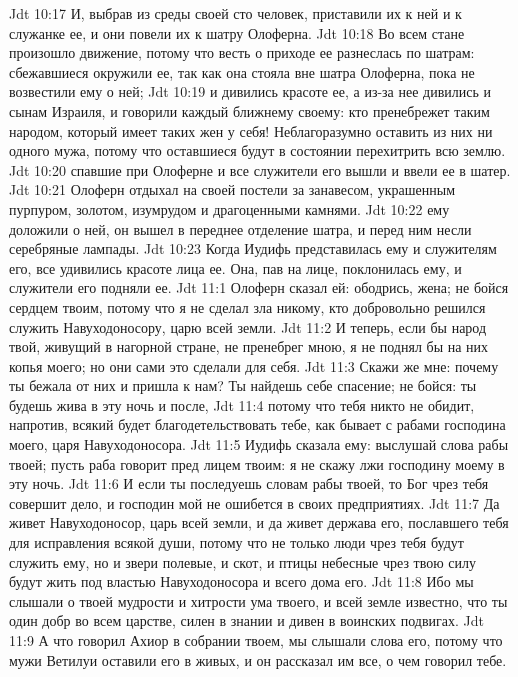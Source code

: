 \vs Jdt 10:17 И, выбрав из среды своей сто человек, приставили их к ней и к служанке ее, и они повели их к шатру Олоферна.
\vs Jdt 10:18 Во всем стане произошло движение, потому что весть о приходе ее разнеслась по шатрам: сбежавшиеся окружили ее, так как она стояла вне шатра Олоферна, пока не возвестили ему о ней;
\vs Jdt 10:19 и дивились красоте ее, а из-за нее дивились и сынам Израиля, и говорили каждый ближнему своему: кто пренебрежет таким народом, который имеет таких жен у себя! Неблагоразумно оставить из них ни одного мужа, потому что оставшиеся будут в состоянии перехитрить всю землю.
\vs Jdt 10:20  спавшие при Олоферне и все служители его вышли и ввели ее в шатер.
\vs Jdt 10:21 Олоферн отдыхал на своей постели за занавесом, украшенным пурпуром, золотом, изумрудом и драгоценными камнями.
\vs Jdt 10:22  ему доложили о ней, он вышел в переднее отделение шатра, и перед ним несли серебряные лампады.
\vs Jdt 10:23 Когда Иудифь представилась ему и служителям его, все удивились красоте лица ее. Она, пав на лице, поклонилась ему, и служители его подняли ее.
\vs Jdt 11:1 Олоферн сказал ей: ободрись, жена; не бойся сердцем твоим, потому что я не сделал зла никому, кто добровольно решился служить Навуходоносору, царю всей земли.
\vs Jdt 11:2 И теперь, если бы народ твой, живущий в нагорной стране, не пренебрег мною, я не поднял бы на них копья моего; но они сами это сделали для себя.
\vs Jdt 11:3 Скажи же мне: почему ты бежала от них и пришла к нам? Ты найдешь себе  спасение; не бойся: ты будешь жива в эту ночь и после,
\vs Jdt 11:4 потому что тебя никто не обидит, напротив, всякий будет благодетельствовать тебе, как бывает с рабами господина моего, царя Навуходоносора.
\vs Jdt 11:5 Иудифь сказала ему: выслушай слова рабы твоей; пусть раба говорит пред лицем твоим: я не скажу лжи господину моему в эту ночь.
\vs Jdt 11:6 И если ты последуешь словам рабы твоей, то Бог чрез тебя совершит дело, и господин мой не ошибется в своих предприятиях.
\vs Jdt 11:7 Да живет Навуходоносор, царь всей земли, и да живет держава его, пославшего тебя для исправления всякой души, потому что не только люди чрез тебя будут служить ему, но и звери полевые, и скот, и птицы небесные чрез твою силу будут жить под властью Навуходоносора и всего дома его.
\vs Jdt 11:8 Ибо мы слышали о твоей мудрости и хитрости ума твоего, и всей земле известно, что ты один добр во всем царстве, силен в знании и дивен в воинских подвигах.
\vs Jdt 11:9 А что говорил Ахиор в собрании твоем, мы слышали слова его, потому что мужи Ветилуи оставили его в живых, и он рассказал им все, о чем говорил тебе.
